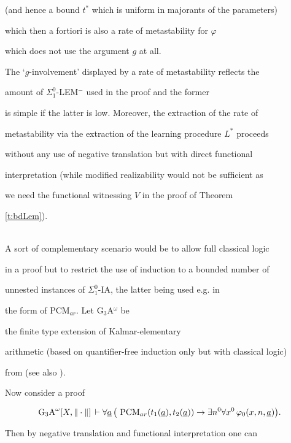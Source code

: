 \documentclass[1p]{elsarticle}
\theoremstyle{plain}
\theoremstyle{definition}
\theoremstyle{remark}
\theoremstyle{definition}
\begin{document}
{(and hence a bound $t^*$ which is uniform in majorants of the parameters) 

which then a fortiori is also a rate of metastability for $\varphi$ 

which does not use the argument $g$ at all.

The `$g$-involvement' displayed by a rate of metastability reflects the 

amount of $\Sigma^0_1$-LEM$^-$ used in the proof and the former 

is simple if the latter is low. Moreover, the extraction of the rate of 

metastability via the extraction of the learning procedure $L^*$ proceeds 

without any use of negative translation but with direct functional 

interpretation (while modified realizability would not be sufficient as 

we need the functional witnessing $V$ in the proof of Theorem 

\ref{t:bdLem}).

\\[2mm] 

A sort of complementary scenario would be to allow full classical logic 

in a proof but to restrict the use of induction to a bounded number of 

unnested instances of $\Sigma^0_1$-IA, the latter being used e.g. in 

the form of PCM$_{ar}.$ Let {\rm G$_3$A$^{\omega}$} be 

the finite type extension of Kalmar-elementary 

arithmetic (based on quantifier-free induction only but with classical logic) 

from \cite{Kohlenbach(lowrate)} (see also \cite{Kohlenbach(book)}).

Now consider a proof 

\[\mbox{\rm G$_3$A}^{\omega}[X,\|\cdot\|]\,

\vdash   

\forall \underline{a}\, \big( 

\ \mbox{\rm PCM}_{ar}(t_1(\underline{a}),

t_2(\underline{a}))

 \rightarrow \exists n^0\forall x^0\,\varphi_0(x,n,\underline{a})\big).  \] 

Then by negative translation and functional interpretation one can 

}
\end{document}
